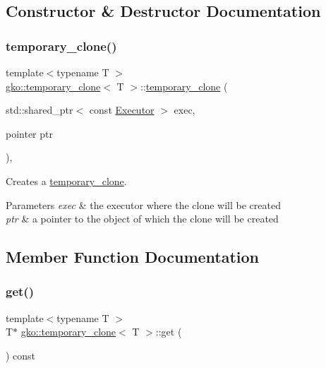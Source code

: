 \subsection{Constructor \& Destructor Documentation}
\mbox{\label{classgko_1_1temporary__clone_a73b2e7db31555df95b827625f85da4be}} 
\subsubsection{\texorpdfstring{temporary\+\_\+clone()}{temporary\_clone()}}
{\footnotesize\ttfamily template$<$typename T $>$ \\
\hyperlink{classgko_1_1temporary__clone}{gko\+::temporary\+\_\+clone}$<$ T $>$\+::\hyperlink{classgko_1_1temporary__clone}{temporary\+\_\+clone} (\begin{DoxyParamCaption}\item[{std\+::shared\+\_\+ptr$<$ const \hyperlink{classgko_1_1Executor}{Executor} $>$}]{exec,  }\item[{pointer}]{ptr }\end{DoxyParamCaption})\hspace{0.3cm}{\ttfamily [inline]}, {\ttfamily [explicit]}}



Creates a \hyperlink{classgko_1_1temporary__clone}{temporary\+\_\+clone}. 


\begin{DoxyParams}{Parameters}
{\em exec} & the executor where the clone will be created \\
\hline
{\em ptr} & a pointer to the object of which the clone will be created \\
\hline
\end{DoxyParams}


\subsection{Member Function Documentation}
\mbox{\label{classgko_1_1temporary__clone_a38042e39a039070cc97e225435d5ed9e}} 
\subsubsection{\texorpdfstring{get()}{get()}}
{\footnotesize\ttfamily template$<$typename T $>$ \\
T$\ast$ \hyperlink{classgko_1_1temporary__clone}{gko\+::temporary\+\_\+clone}$<$ T $>$\+::get (\begin{DoxyParamCaption}{ }\end{DoxyParamCaption}) const\hspace{0.3cm}{\ttfamily [inline]}}



